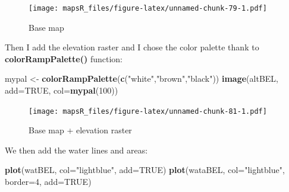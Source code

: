 \documentclass[]{report}
\newenvironment{Shaded}{\begin{snugshade}}{\end{snugshade}}
\newcommand{\DataTypeTok}[1]{\textcolor[rgb]{0.13,0.29,0.53}{#1}}
\newcommand{\DecValTok}[1]{\textcolor[rgb]{0.00,0.00,0.81}{#1}}
\newcommand{\FloatTok}[1]{\textcolor[rgb]{0.00,0.00,0.81}{#1}}
\newcommand{\KeywordTok}[1]{\textcolor[rgb]{0.13,0.29,0.53}{\textbf{#1}}}
\newcommand{\NormalTok}[1]{#1}
\newcommand{\OperatorTok}[1]{\textcolor[rgb]{0.81,0.36,0.00}{\textbf{#1}}}
\newcommand{\OtherTok}[1]{\textcolor[rgb]{0.56,0.35,0.01}{#1}}
\newcommand{\StringTok}[1]{\textcolor[rgb]{0.31,0.60,0.02}{#1}}
\begin{document}
\begin{Shaded}
\end{Shaded}

\begin{figure}
\centering
\texttt{[image: mapsR\_files/figure-latex/unnamed-chunk-79-1.pdf]}
\caption{Base map}
\end{figure}

Then I add the elevation raster and I chose the color palette thank to
\textbf{colorRampPalette()} function:

\begin{Shaded}
\begin{Highlighting}[]
\NormalTok{mypal <-}\StringTok{ }\KeywordTok{colorRampPalette}\NormalTok{(}\KeywordTok{c}\NormalTok{(}\StringTok{"white"}\NormalTok{,}\StringTok{"brown"}\NormalTok{,}\StringTok{"black"}\NormalTok{))}
\KeywordTok{image}\NormalTok{(altBEL, }\DataTypeTok{add=}\OtherTok{TRUE}\NormalTok{, }\DataTypeTok{col=}\KeywordTok{mypal}\NormalTok{(}\DecValTok{100}\NormalTok{))}
\end{Highlighting}
\end{Shaded}

\begin{figure}
\centering
\texttt{[image: mapsR\_files/figure-latex/unnamed-chunk-81-1.pdf]}
\caption{Base map + elevation raster}
\end{figure}

We then add the water lines and areas:

\begin{Shaded}
\begin{Highlighting}[]
\KeywordTok{plot}\NormalTok{(watBEL, }\DataTypeTok{col=}\StringTok{"lightblue"}\NormalTok{, }\DataTypeTok{add=}\OtherTok{TRUE}\NormalTok{)}
\KeywordTok{plot}\NormalTok{(wataBEL, }\DataTypeTok{col=}\StringTok{"lightblue"}\NormalTok{, }\DataTypeTok{border=}\DecValTok{4}\NormalTok{, }\DataTypeTok{add=}\OtherTok{TRUE}\NormalTok{)}
\end{Highlighting}
\end{Shaded}
\end{document}
